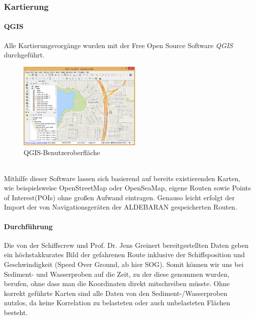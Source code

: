 \subsubsection{Kartierung}
\paragraph{QGIS}
Alle Kartierungsvorgänge wurden mit der Free Open Source Software \emph{QGIS}\cite{qgis} durchgeführt.
\begin{figure}[ht]
    \centering
    \includegraphics[width=6cm]{Images/QGIS/about-screenshot.png}
    \caption[fig:qgisabout]{QGIS-Benutzeroberfläche}
\end{figure}
\\Mithilfe dieser Software lassen sich basierend auf bereits existierenden Karten, 
wie beispielsweise OpenStreetMap\cite{ostrm} oder OpenSeaMap\cite{oseam}, eigene Routen sowie
Points of Interest(POIs) ohne großen Aufwand eintragen. Genauso leicht erfolgt der Import der von 
Navigationsgeräten der ALDEBARAN gespeicherten Routen.
\paragraph{Durchführung}
Die von der Schiffscrew und Prof. Dr. Jens Greinert bereitgestellten Daten geben ein höchstakkurates Bild der
gefahrenen Route inklusive der Schiffsposition und Geschwindigkeit (Speed Over Ground, ab hier SOG).
Somit können wir uns bei Sediment- und Wasserproben auf die Zeit, zu der diese genommen wurden, berufen,
ohne dass man die Koordinaten direkt mitschreiben müsste.
Ohne korrekt geführte Karten sind alle Daten von den Sediment-/Wasserproben nutzlos, da keine Korrelation
zu belasteten oder auch unbelasteten Flächen besteht.
